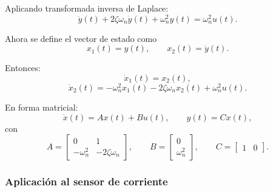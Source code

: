 \documentclass[12pt, a4paper,journal, onecolumn, compsoc]{IEEEtran}
\begin{document}
Aplicando transformada inversa de Laplace:
\begin{equation}
    \ddot{y}(t)+2\zeta\omega_n \dot{y}(t)+\omega_n^2 y(t)=\omega_n^2 u(t).
\end{equation}

Ahora se define el vector de estado como
\begin{equation}
    x_1(t)=y(t), \qquad x_2(t)=\dot{y}(t).
\end{equation}

Entonces:
\begin{equation}
    \dot{x}_1(t)=x_2(t),
\end{equation}
\begin{equation}
    \dot{x}_2(t)= -\omega_n^2 x_1(t)-2\zeta\omega_n x_2(t)+\omega_n^2 u(t).
\end{equation}

En forma matricial:
\begin{equation}
    \dot{x}(t)=Ax(t)+Bu(t), \qquad y(t)=Cx(t),
\end{equation}
con
\begin{equation}
    A=
    \begin{bmatrix}
        0 & 1 \\
        -\omega_n^2 & -2\zeta\omega_n
    \end{bmatrix},
    \qquad
    B=
    \begin{bmatrix}
        0 \\
        \omega_n^2
    \end{bmatrix},
    \qquad
    C=
    \begin{bmatrix}
        1 & 0
    \end{bmatrix}.
\end{equation}

\subsubsection*{Aplicación al sensor de corriente}
\end{document}
